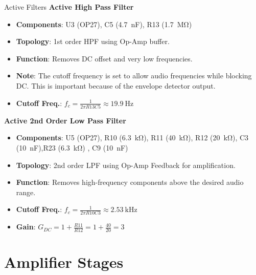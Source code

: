\documentclass[10pt,xcolor={table,dvipsnames},t]{beamer}
\begin{document}
\begin{frame}{Active Filters}
\textbf{Active High Pass Filter}
\begin{itemize}
    \item \textbf{Components}: U3 (OP27), C5 (\SI{4.7}{\nano\farad}), R13 (\SI{1.7}{\mega\ohm})
    \item \textbf{Topology}: 1st order HPF using Op-Amp buffer.
    \item \textbf{Function}: Removes DC offset and very low frequencies.
    \item \textbf{Note}: The cutoff frequency is set to allow audio frequencies while blocking DC. This is important because of the envelope detector output.
    \item \textbf{Cutoff Freq.}: $f_c = \frac{1}{2\pi R13 C5} \approx \SI{19.9}{\hertz}$
\end{itemize}
\vspace{1em}
\textbf{Active 2nd Order Low Pass Filter}
\begin{itemize}
    \item \textbf{Components}: U5 (OP27), R10 (\SI{6.3}{\kilo\ohm}), R11 (\SI{40}{\kilo\ohm}), R12 (\SI{20}{\kilo\ohm}), C3 (\SI{10}{\nano\farad}),R23 (\SI{6.3}{\kilo\ohm}) , C9 (\SI{10}{\nano\farad})
    \item \textbf{Topology}: 2nd order LPF using Op-Amp Feedback for amplification.
    \item \textbf{Function}: Removes high-frequency components above the desired audio range.
    \item \textbf{Cutoff Freq.}: $f_c = \frac{1}{2\pi R10 C3} \approx \SI{2.53}{\kilo\hertz}$
    \item \textbf{Gain}: $G_{DC} = 1 + \frac{R11}{R12} = 1 + \frac{40}{20} = 3$
\end{itemize}
\end{frame}

\section{Amplifier Stages}
\end{document}
